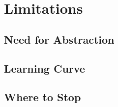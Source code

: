 \chapter{Limitations}
  
  \section{Need for Abstraction}
    
  \section{Learning Curve}
  
  \section{Where to Stop}
